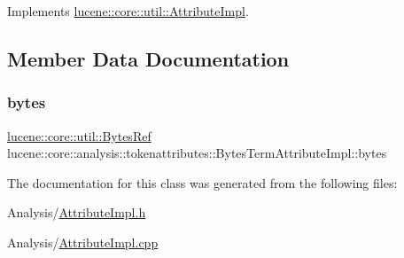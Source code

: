Implements \mbox{\hyperlink{classlucene_1_1core_1_1util_1_1AttributeImpl_a010e8937832f53139c8fe42757476895}{lucene\+::core\+::util\+::\+Attribute\+Impl}}.



\subsection{Member Data Documentation}
\mbox{\label{classlucene_1_1core_1_1analysis_1_1tokenattributes_1_1BytesTermAttributeImpl_aedd53d552069d367ff2ede8111ce1944}} 
\subsubsection{\texorpdfstring{bytes}{bytes}}
{\footnotesize\ttfamily \mbox{\hyperlink{classlucene_1_1core_1_1util_1_1BytesRef}{lucene\+::core\+::util\+::\+Bytes\+Ref}} lucene\+::core\+::analysis\+::tokenattributes\+::\+Bytes\+Term\+Attribute\+Impl\+::bytes\hspace{0.3cm}{\ttfamily [private]}}



The documentation for this class was generated from the following files\+:\begin{DoxyCompactItemize}
\item 
Analysis/\mbox{\hyperlink{AttributeImpl_8h}{Attribute\+Impl.\+h}}\item 
Analysis/\mbox{\hyperlink{AttributeImpl_8cpp}{Attribute\+Impl.\+cpp}}\end{DoxyCompactItemize}
